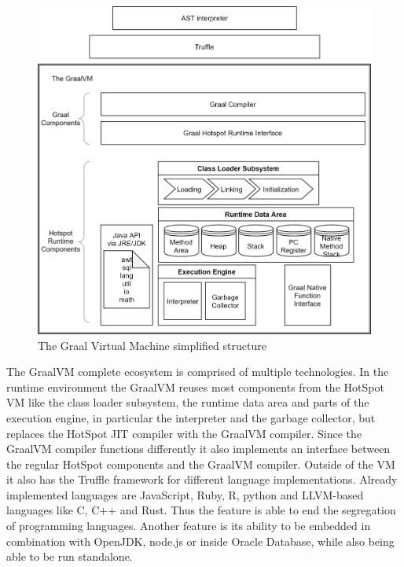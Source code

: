 \begin{figure}[h!]
    \includegraphics[scale=0.2]{../figures/GraalVM.png}
    \caption{The Graal Virtual Machine simplified structure}
    \label{fig:graalvm}
\end{figure}

The GraalVM complete ecosystem is comprised of multiple technologies. In the runtime environment the GraalVM reuses most components from the HotSpot VM like the class loader subsystem, the runtime data area and parts of the execution engine, in particular the interpreter and the garbage collector, but replaces the HotSpot JIT compiler with the GraalVM compiler. Since the GraalVM compiler functions differently it also implements an interface between the regular HotSpot components and the GraalVM compiler. Outside of the VM it also has the Truffle framework for different language implementations. Already implemented languages are JavaScript, Ruby, R, python and LLVM-based languages like C, C++ and Rust. Thus the feature is able to end the segregation of programming languages. Another feature is its ability to be embedded in combination with OpenJDK, node.js or inside Oracle Database, while also being able to be run standalone. \cite{graalVMStart}
